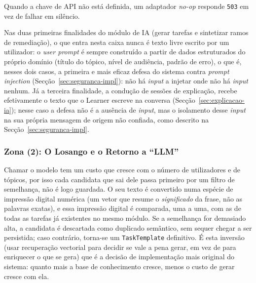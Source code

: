 Quando a chave de API não está definida, um adaptador \textit{no-op} responde \texttt{503} em vez de falhar em silêncio.

Nas duas primeiras finalidades do módulo de IA (gerar tarefas e sintetizar ramos de remediação), o que entra nesta caixa nunca é texto livre escrito por um utilizador: o \textit{user prompt} é sempre construído a partir de dados estruturados do próprio domínio (título do tópico, nível de audiência, padrão de erro), o que é, nesses dois casos, a primeira e mais eficaz defesa do sistema contra \textit{prompt injection} (Secção~\ref{sec:seguranca-impl}): não há \textit{input} a injetar onde não há \textit{input} nenhum. Já a terceira finalidade, a condução de sessões de explicação, recebe efetivamente o texto que o Learner escreve na conversa (Secção~\ref{sec:explicacao-ia}); nesse caso a defesa não é a ausência de \textit{input}, mas o isolamento desse \textit{input} na sua própria mensagem de origem não confiada, como descrito na Secção~\ref{sec:seguranca-impl}.

\subsubsection*{Zona (2): O Losango e o Retorno a ``LLM''}

Chamar o modelo tem um custo que cresce com o número de utilizadores e de tópicos, por isso cada candidata que sai dele passa primeiro por um filtro de semelhança, não é logo guardada. O seu texto é convertido numa espécie de impressão digital numérica (um vetor que resume o \textit{significado} da frase, não as palavras exatas), e essa impressão digital é comparada, uma a uma, com as de todas as tarefas já existentes no mesmo módulo. Se a semelhança for demasiado alta, a candidata é descartada como duplicado semântico, sem sequer chegar a ser persistida; caso contrário, torna-se um \texttt{TaskTemplate} definitivo. É esta inversão (usar recuperação vectorial para decidir se vale a pena gerar, em vez de para enriquecer o que se gera) que é a decisão de implementação mais original do sistema: quanto mais a base de conhecimento cresce, menos o custo de gerar cresce com ela. \label{cap:rag} \label{sec:armazenamento}

